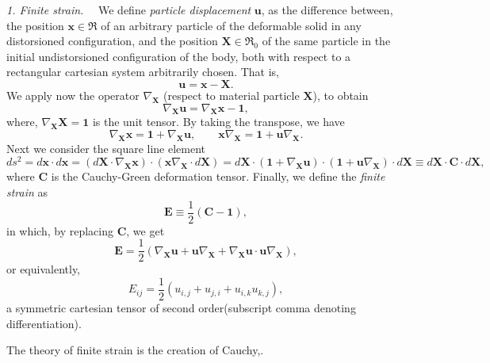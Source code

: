 \documentclass[12pt]{article}
\begin{document}
{{\em 1. Finite strain.} \, \, We define {\em particle displacement} $\mathbf{u}$, as the difference between, the position $\mathbf{x}\in\Re$ of an arbitrary particle of the deformable solid in any distorsioned configuration,  and the position $\mathbf{X}\in\Re_0$ of the same particle in the initial undistorsioned configuration of the body, both with respect to a rectangular cartesian system arbitrarily chosen. That is,
\[\mathbf{u}=\mathbf{x}-\mathbf{X}.\]
We apply now the operator $\nabla_{\mathbf{X}}$ (respect to material particle $\mathbf{X}$), to obtain
\[\nabla_{\mathbf{X}}\mathbf{u}=\nabla_{\mathbf{X}}\mathbf{x}-\mathbf{1},\]
where, $\nabla_{\mathbf{X}}\mathbf{X}=\mathbf{1}$  is the unit tensor. By taking the transpose, we have
\[\nabla_{\mathbf{X}}\mathbf{x}=\mathbf{1}+\nabla_{\mathbf{X}}\mathbf{u}, \qquad \mathbf{x}\nabla_{\mathbf{X}}=\mathbf{1}+\mathbf{u}\nabla_{\mathbf{X}}.\]
Next we consider the square line element
\[ds^2=d\mathbf{x}\cdot{d\mathbf{x}}=(d\mathbf{X}\cdot\nabla_{\mathbf{X}}\mathbf{x})\cdot(\mathbf{x}\nabla_{\mathbf{X}}\cdot{d\mathbf{X}})=d\mathbf{X}\cdot(\mathbf{1}+\nabla_{\mathbf{X}}\mathbf{u})\cdot(\mathbf{1}+\mathbf{u}\nabla_{\mathbf{X}})\cdot{d\mathbf{X}}\equiv {d\mathbf{X}}\cdot\mathbf{C}\cdot{d\mathbf{X}},\]    
where $\mathbf{C}$  is the Cauchy-Green deformation tensor\cite{cite:Cauchy-Green}. Finally, we define the {\em finite strain} as
\[\mathbf{E}\equiv\frac{1}{2}(\mathbf{C}-\mathbf{1}),\]
in which, by replacing $\mathbf{C}$, we get
\[\mathbf{E}=\frac{1}{2}(\nabla_{\mathbf{X}}\mathbf{u}+\mathbf{u}\nabla_{\mathbf{X}}+\nabla_{\mathbf{X}}\mathbf{u}\cdot\mathbf{u}\nabla_{\mathbf{X}}),\]
or equivalently,
\[E_{ij}=\frac{1}{2}(u_{i,j}+u_{j,i}+u_{i,k}u_{k,j}),\]
a symmetric cartesian tensor of second order(subscript comma denoting differentiation).

The theory of finite strain is the creation of Cauchy\cite{cite:Cauchy},\cite{cite:Cauchy1}.

}
\end{document}
